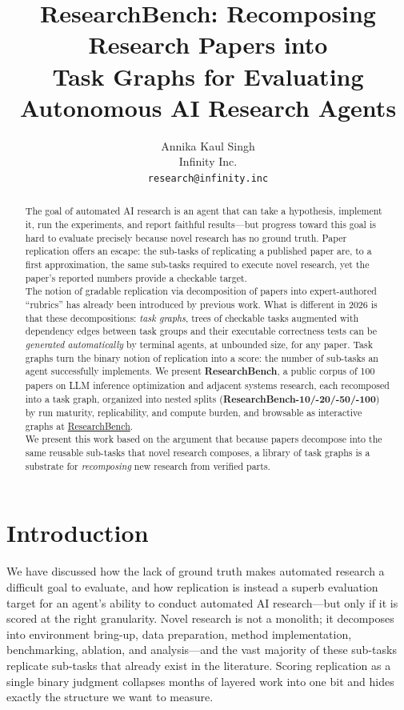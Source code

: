 \documentclass{article}
\title{ResearchBench: Recomposing Research Papers into\\
Task Graphs for Evaluating Autonomous AI Research Agents}
\author{Annika Kaul Singh\\
Infinity Inc.\\
\texttt{research@infinity.inc}}
\date{}
\begin{document}
\maketitle

\begin{abstract}
The goal of automated AI research is an agent that can take a hypothesis,
implement it, run the experiments, and report faithful results---but progress
toward this goal is hard to evaluate precisely because novel research has no
ground truth. Paper replication offers an escape: the sub-tasks of replicating
a published paper are, to a first approximation, the same sub-tasks required
to execute novel research, yet the paper's reported numbers provide a
checkable target. \\
The notion of gradable replication via decomposition of papers into
expert-authored ``rubrics'' has already been introduced by previous work.
What is different in 2026 is that these decompositions: \emph{task graphs},
trees of checkable tasks augmented with dependency edges between task groups
and their executable correctness tests can be \emph{generated automatically}
by terminal agents, at unbounded size, for any paper. Task graphs turn the
binary notion of replication into a score: the number of sub-tasks an agent
successfully implements. We present \textbf{ResearchBench}, a public corpus
of 100 papers on LLM inference optimization and adjacent systems research,
each recomposed into a task graph, organized into nested splits
(\textbf{ResearchBench-10/-20/-50/-100}) by run maturity, replicability, and
compute burden, and browsable as interactive graphs at
\href{https://infinity-ai-institute.github.io/research-bench-rubrics/}{ResearchBench}. \\
We present this work based on the argument that because papers
decompose into the same reusable sub-tasks that novel research composes, a
library of task graphs is a substrate for \emph{recomposing} new research
from verified parts.
\end{abstract}

\section{Introduction}

We have discussed how the lack of ground truth makes automated research a
difficult goal to evaluate, and how replication is instead a superb
evaluation target for an agent's ability to conduct automated AI
research---but only if it is scored at the right granularity. Novel research
is not a monolith; it decomposes into environment bring-up, data preparation,
method implementation, benchmarking, ablation, and analysis---and the vast
majority of these sub-tasks replicate sub-tasks that already exist in the
literature. Scoring replication as a single binary judgment collapses months
of layered work into one bit and hides exactly the structure we want to
measure.
\end{document}
